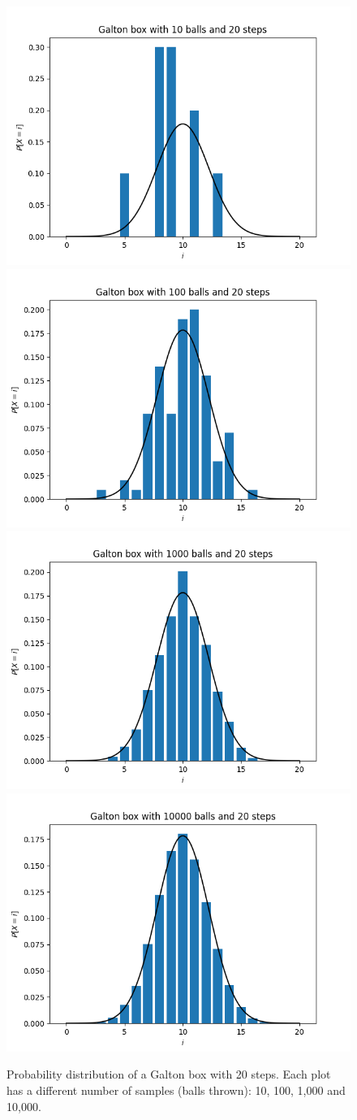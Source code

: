 \documentclass{article}
\begin{document}
\begin{figure}
    \centering
    \includegraphics[width=0.48\linewidth]{plots/20-10-a.png}
    \includegraphics[width=0.48\linewidth]{plots/20-100-a.png}
    \includegraphics[width=0.48\linewidth]{plots/20-1000-a.png}
    \includegraphics[width=0.48\linewidth]{plots/20-10000-a.png}
    \caption{Probability distribution of a Galton box with 20 steps. Each plot has a different number of samples (balls thrown): 10, 100, 1,000 and 10,000.}
    \label{fig:20-steps}
\end{figure}
\end{document}
